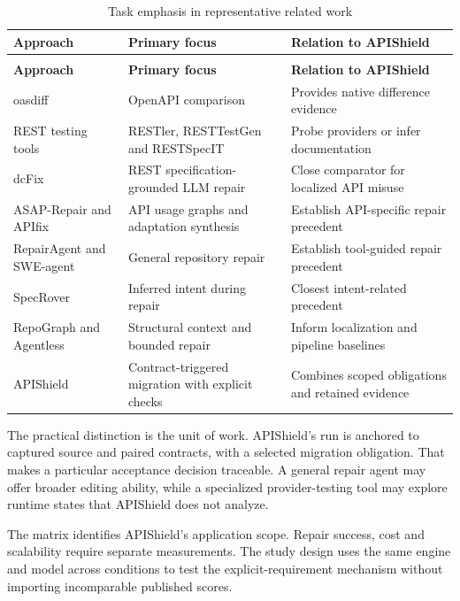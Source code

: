 \documentclass[12pt,a4paper,oneside]{report}
\begin{document}
\begingroup\normalsize\onehalfspacing\setlength{\tabcolsep}{4pt}\renewcommand{\arraystretch}{1.2}
\begin{longtable}{@{}>{\raggedright\arraybackslash}p{}>{\raggedright\arraybackslash}p{}>{\raggedright\arraybackslash}p{}@{}}
\caption{Task emphasis in representative related work}\label{tab:2.1}\\
\toprule
\textbf{Approach} & \textbf{Primary focus} & \textbf{Relation to APIShield}\\\midrule
\endfirsthead
\multicolumn{3}{l}{\small Table 2.1 continued}\\\toprule
\textbf{Approach} & \textbf{Primary focus} & \textbf{Relation to APIShield}\\\midrule
\endhead
\bottomrule\endfoot
oasdiff & OpenAPI comparison & Provides native difference evidence\\
REST testing tools & RESTler, RESTTestGen and RESTSpecIT & Probe providers or infer documentation\\
dcFix & REST specification-grounded LLM repair & Close comparator for localized API misuse\\
ASAP-Repair and APIfix & API usage graphs and adaptation synthesis & Establish API-specific repair precedent\\
RepairAgent and SWE-agent & General repository repair & Establish tool-guided repair precedent\\
SpecRover & Inferred intent during repair & Closest intent-related precedent\\
RepoGraph and Agentless & Structural context and bounded repair & Inform localization and pipeline baselines\\
APIShield & Contract-triggered migration with explicit checks & Combines scoped obligations and retained evidence\\
\end{longtable}\endgroup

The practical distinction is the unit of work. APIShield's run is anchored to captured source and paired contracts, with a selected migration obligation. That makes a particular acceptance decision traceable. A general repair agent may offer broader editing ability, while a specialized provider-testing tool may explore runtime states that APIShield does not analyze.

The matrix identifies APIShield's application scope. Repair success, cost and scalability require separate measurements. The study design uses the same engine and model across conditions to test the explicit-requirement mechanism without importing incomparable published scores.
\end{document}
